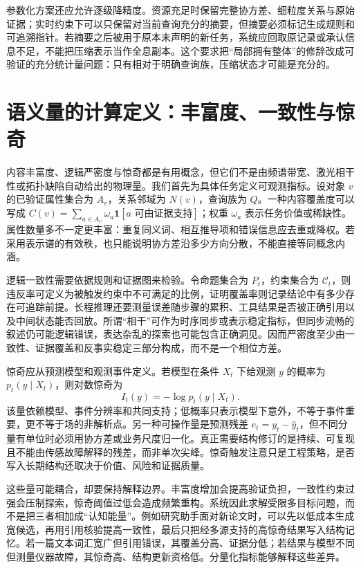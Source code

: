 参数化方案还应允许逐级降精度。资源充足时保留完整协方差、细粒度关系与原始证据；实时约束下可以只保留对当前查询充分的摘要，但摘要必须标记生成规则和可追溯指针。若摘要之后被用于原本未声明的新任务，系统应回取原记录或承认信息不足，不能把压缩表示当作全息副本。这个要求把“局部拥有整体”的修辞改成可验证的充分统计量问题：只有相对于明确查询族，压缩状态才可能是充分的。

\section{语义量的计算定义：丰富度、一致性与惊奇}
\label{sec:semantic_physical_mapping}

内容丰富度、逻辑严密度与惊奇都是有用概念，但它们不是由频谱带宽、激光相干性或拓扑缺陷自动给出的物理量。我们首先为具体任务定义可观测指标。设对象 $v$ 的已验证属性集合为 $A_v$，关系邻域为 $N(v)$，查询族为 $Q$。一种内容覆盖度可以写成 $C(v)=\sum_{a\in A_v}\omega_a\mathbf 1[a\text{ 可由证据支持}]$；权重 $\omega_a$ 表示任务价值或稀缺性。属性数量多不一定更丰富：重复同义词、相互推导项和错误信息应去重或降权。若采用表示谱的有效秩，也只能说明协方差沿多少方向分散，不能直接等同概念内涵。

逻辑一致性需要依据规则和证据图来检验。令命题集合为 $P_t$，约束集合为 $\mathcal C_t$，则违反率可定义为被触发约束中不可满足的比例，证明覆盖率则记录结论中有多少存在可追踪前提。长程推理还要测量误差随步骤的累积、工具结果是否被正确引用以及中间状态能否回放。所谓“相干”可作为时序同步或表示稳定指标，但同步流畅的叙述仍可能逻辑错误，表达杂乱的探索也可能包含正确洞见。因而严密度至少由一致性、证据覆盖和反事实稳定三部分构成，而不是一个相位方差。

惊奇应从预测模型和观测事件定义。若模型在条件 $X_t$ 下给观测 $y$ 的概率为 $p_t(y\mid X_t)$，则对数惊奇为
\begin{equation}
 I_t(y)=-\log p_t(y\mid X_t).
\end{equation}
该量依赖模型、事件分辨率和共同支持；低概率只表示模型下意外，不等于事件重要，更不等于场的非解析点。另一种可操作量是预测残差 $e_t=y_t-\hat y_t$，但不同分量有单位时必须用协方差或业务尺度归一化。真正需要结构修订的是持续、可复现且不能由传感故障解释的残差，而非单次尖峰。惊奇触发注意只是工程策略，是否写入长期结构还取决于价值、风险和证据质量。

这些量可能耦合，却要保持解释边界。丰富度增加会提高验证负担，一致性约束过强会压制探索，惊奇阈值过低会造成频繁重构。系统因此求解受限多目标问题，而不是把三者相加成“认知能量”。例如研究助手面对新论文时，可以先以低成本生成宽候选，再用引用核验提高一致性，最后只把经多源支持的高惊奇结果写入结构记忆。若一篇文本词汇宽广但引用错误，其覆盖分高、证据分低；若结果与模型不同但测量仪器故障，其惊奇高、结构更新资格低。分量化指标能够解释这些差异。

